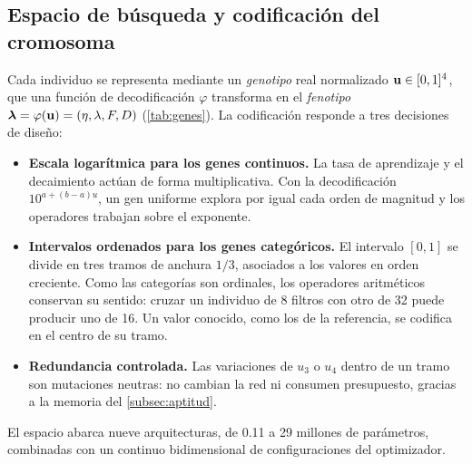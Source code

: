 \subsection{Espacio de búsqueda y codificación del cromosoma}\label{subsec:codificacion}

Cada individuo se representa mediante un \emph{genotipo} real normalizado $\mathbf{u}\in[0,1]^4$, que una función de decodificación $\varphi$ transforma en el \emph{fenotipo} $\bm{\lambda}=\varphi(\mathbf{u})=(\eta,\lambda,F,D)$ (\cref{tab:genes}). La codificación responde a tres decisiones de diseño:

\begin{itemize}
  \item \textbf{Escala logarítmica para los genes continuos.} La tasa de aprendizaje y el decaimiento actúan de forma multiplicativa. Con la decodificación $10^{a+(b-a)u}$, un gen uniforme explora por igual cada orden de magnitud y los operadores trabajan sobre el exponente.
  \item \textbf{Intervalos ordenados para los genes categóricos.} El intervalo $[0,1]$ se divide en tres tramos de anchura $1/3$, asociados a los valores en orden creciente. Como las categorías son ordinales, los operadores aritméticos conservan su sentido: cruzar un individuo de 8 filtros con otro de 32 puede producir uno de 16. Un valor conocido, como los de la referencia, se codifica en el centro de su tramo.
  \item \textbf{Redundancia controlada.} Las variaciones de $u_3$ o $u_4$ dentro de un tramo son mutaciones neutras: no cambian la red ni consumen presupuesto, gracias a la memoria del \cref{subsec:aptitud}.
\end{itemize}

El espacio abarca nueve arquitecturas, de 0.11 a 29 millones de parámetros, combinadas con un continuo bidimensional de configuraciones del optimizador.

